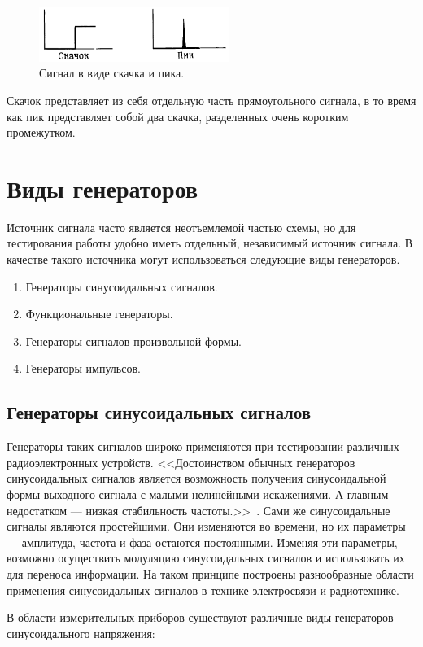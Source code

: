 	\begin{figure}[H]
    \centering
    \includegraphics[width=0.55\textwidth]{../image/s_sp.png}
    \caption{Сигнал в виде скачка и пика.}
	\end{figure}

Скачок представляет из себя отдельную часть прямоугольного сигнала, в то время как пик представляет собой два скачка, разделенных очень коротким промежутком.


\section{Виды генераторов}
Источник сигнала часто является неотъемлемой частью схемы, но для тестирования работы удобно иметь отдельный, независимый источник сигнала. В качестве такого источника могут использоваться следующие виды генераторов.
\begin{enumerate}
	\item Генераторы синусоидальных сигналов.
	\item Функциональные генераторы.
	\item Генераторы сигналов произвольной формы.
	\item Генераторы импульсов.
\end{enumerate}

\subsection*{Генераторы синусоидальных сигналов}
Генераторы таких сигналов широко применяются при тестировании различных радиоэлектронных устройств. <<Достоинством обычных генераторов синусоидальных сигналов является возможность получения синусоидальной формы выходного сигнала с малыми нелинейными искажениями. А главным недостатком — низкая стабильность частоты.>>~\cite{dgs}. Сами же синусоидальные сигналы являются простейшими. Они изменяются во времени, но их параметры --- амплитуда, частота и фаза остаются постоянными. Изменяя эти параметры, возможно осуществить модуляцию синусоидальных сигналов и использовать их для переноса информации. На таком принципе построены разнообразные области применения синусоидальных сигналов в технике электросвязи и радиотехнике.

В области измерительных приборов существуют различные виды генераторов синусоидального напряжения:

